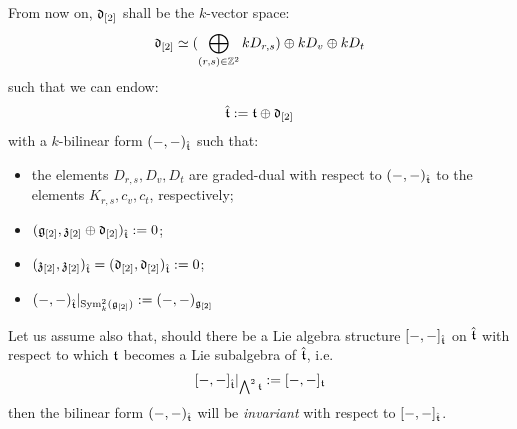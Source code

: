         \begin{convention} \label{conv: orthogonal_complement_of_toroidal_centres}
            From now on, $\mathfrak{d}_{[2]}$ shall be the $k$-vector space:
                $$\mathfrak{d}_{[2]} \simeq ( \bigoplus_{(r, s) \in \mathbb{Z}^2} k D_{r, s} ) \oplus k D_v \oplus k D_t$$
            such that we can endow:
                $$\hat{\mathfrak{t}} := \mathfrak{t}\oplus \mathfrak{d}_{[2]}$$
            with a $k$-bilinear form $(-, -)_{\hat{\mathfrak{t}}}$ such that:
            \begin{itemize}
                \item the elements $D_{r, s}, D_v, D_t$ are graded-dual with respect to $(-, -)_{\hat{\mathfrak{t}}}$ to the elements $K_{r, s}, c_v, c_t$, respectively;
                \item $(\mathfrak{g}_{[2]}, \mathfrak{z}_{[2]} \oplus \mathfrak{d}_{[2]})_{\hat{\mathfrak{t}}} := 0$;
                \item $(\mathfrak{z}_{[2]}, \mathfrak{z}_{[2]})_{\hat{\mathfrak{t}}} = (\mathfrak{d}_{[2]}, \mathfrak{d}_{[2]})_{\hat{\mathfrak{t}}} := 0$;
                \item $(-, -)_{\hat{\mathfrak{t}}}|_{\mathrm{Sym}^2_{k}(\mathfrak{g}_{[2]})} := (-, -)_{\mathfrak{g}_{[2]}}$
            \end{itemize}
        \end{convention}
        \begin{convention}
            Let us assume also that, should there be a Lie algebra structure $[-, -]_{\hat{\mathfrak{t}}}$ on $\hat{\mathfrak{t}}$ with respect to which $\mathfrak{t}$ becomes a Lie subalgebra of $\hat{\mathfrak{t}}$, i.e.
                $$[-, -]_{\hat{\mathfrak{t}}}|_{\bigwedge^2 \mathfrak{t}} := [-, -]_{\mathfrak{t}}$$
            then the bilinear form $(-, -)_{\hat{\mathfrak{t}}}$ will be \textit{invariant} with respect to $[-, -]_{\hat{\mathfrak{t}}}$.
        \end{convention}

